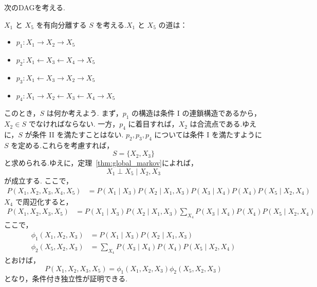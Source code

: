 \documentclass[uplatex, dvipdfmx]{jsarticle}
\begin{document}
\begin{exm}{}
  次のDAGを考える.

  \begin{center}
  \end{center}

  $X_1$ と $X_5$ を有向分離する $S$ を考える.$X_1$ と $X_5$ の道は：
  \begin{itemize}
      \item $p_1 : X_1 \to X_2 \to X_5$
      \item $p_2 : X_1 \leftarrow X_3 \leftarrow X_4 \to X_5$
      \item $p_3 : X_1 \leftarrow X_3 \to X_2 \to X_5$
      \item $p_4 : X_1 \to X_2 \leftarrow X_3 \leftarrow X_4 \to X_5$
  \end{itemize}

  このとき，$S$ は何か考えよう.
  まず，$p_1$ の構造は条件 I の連鎖構造であるから，$X_2 \in S$ でなければならない.
  一方，$p_4$ に着目すれば，$X_2$ は合流点である.ゆえに，$S$ が条件 II を満たすことはない.
  $p_2, p_3, p_4$ については条件 I を満たすように $S$ を定める.これらを考慮すれば，
  \begin{equation*}
      S = \{X_2, X_3\}
  \end{equation*}
  と求められる.ゆえに，定理~\ref{thm:global_markov}によれば，
  \begin{equation*}
      X_1 \perp X_5 \mid X_2, X_3
  \end{equation*}
  が成立する.
  ここで，
  \begin{align*}
      P(X_1, X_2, X_3, X_4, X_5) &= P(X_1 \mid X_3) P(X_2 \mid X_1, X_3) P(X_3 \mid X_4) P(X_4) P(X_5 \mid X_2, X_4)
  \end{align*}
  $X_4$ で周辺化すると，
  \begin{align*}
      P(X_1, X_2, X_3, X_5) &= P(X_1 \mid X_3) P(X_2 \mid X_1, X_3) \sum_{X_4} P(X_3 \mid X_4) P(X_4) P(X_5 \mid X_2, X_4)
  \end{align*}
  ここで，
  \begin{align*}
      \phi_1(X_1, X_2, X_3) &= P(X_1 \mid X_3) P(X_2 \mid X_1, X_3) \\
      \phi_2(X_5, X_2, X_3) &= \sum_{X_4} P(X_3 \mid X_4) P(X_4) P(X_5 \mid X_2, X_4)
  \end{align*}
  とおけば，
  \begin{equation}
      P(X_1, X_2, X_3, X_5) = \phi_1(X_1, X_2, X_3) \phi_2(X_5, X_2, X_3)
  \end{equation}
  となり，条件付き独立性が証明できる.
\end{exm}
\end{document}
